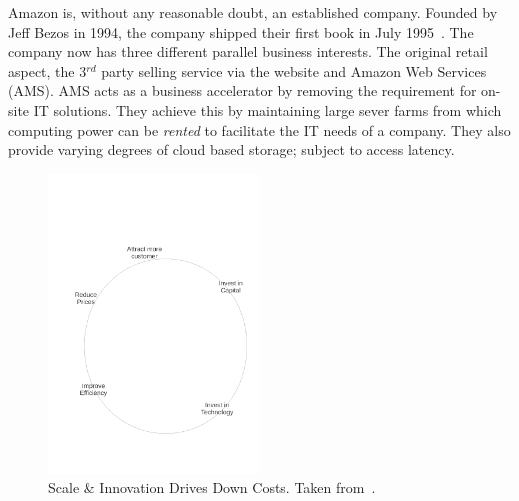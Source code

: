 {}

Amazon is, without any reasonable doubt, an established company.
Founded by Jeff Bezos in 1994, the company shipped their first book in July 1995~\cite{seattle}.
The company now has three different parallel business interests.
The original retail aspect, the 3$^{rd}$ party selling service via the website and Amazon Web Services (AMS).
AMS acts as a business accelerator by removing the requirement for on-site IT solutions.
They achieve this by maintaining large sever farms from which computing power can be \emph{rented} to facilitate the IT needs of a company.
They also provide varying degrees of cloud based storage; subject to access latency.




\begin{figure}
	\centering
	\includegraphics[width=0.5\textwidth]{./Figures/ScaleInnovation.pdf}
	\caption{Scale \& Innovation Drives Down Costs. Taken from~\cite{gavin2014ams}.}
	\label{fig:ScaleInnovation}
\end{figure}
